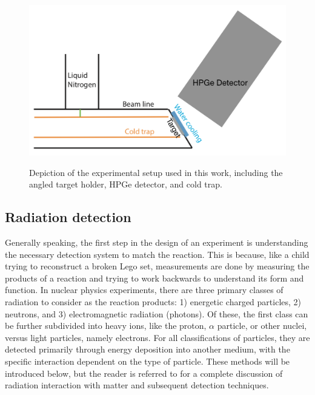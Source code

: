 \begin{figure}
\centering
\includegraphics[width=0.8\linewidth]{figures/expSetup.png}
\label{fig: setup}
\caption{Depiction of the experimental setup used in this work, including the angled target holder, HPGe detector, and cold trap.}
\end{figure}



\subsection{Radiation detection}
\label{sec: detectors}

Generally speaking, the first step in the design of an experiment is understanding the necessary detection system to match the reaction. This is because, like a child trying to reconstruct a broken Lego set, measurements are done by measuring the products of a reaction and trying to work backwards to understand its form and function. In nuclear physics experiments, there are three primary classes of radiation to consider as the reaction products: 1) energetic charged particles, 2) neutrons, and 3) electromagnetic radiation (photons). Of these, the first class can be further subdivided into heavy ions, like the proton, $\alpha$ particle, or other nuclei, versus light particles, namely electrons. For all classifications of particles, they are detected primarily through energy deposition into another medium, with the specific interaction dependent on the type of particle. These methods will be introduced below, but the reader is referred to \cite{KnollBook} for a complete discussion of radiation interaction with matter and subsequent detection techniques.  

